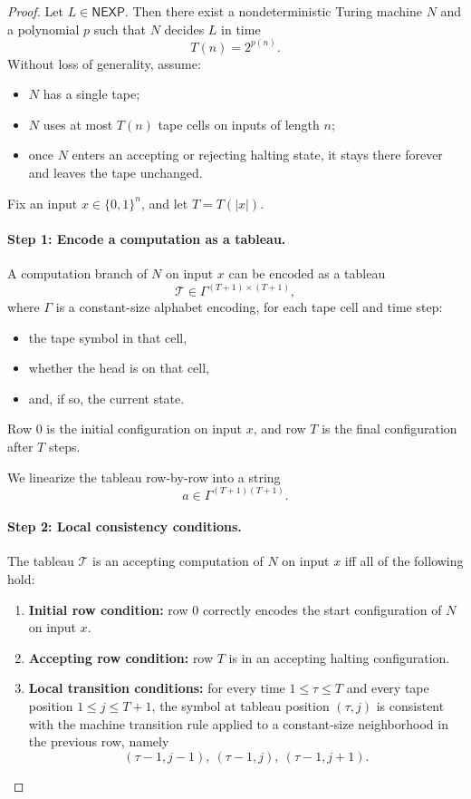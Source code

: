 \documentclass[11pt]{article}
\begin{document}
\begin{proof}
Let \(L\in \mathsf{NEXP}\). Then there exist a nondeterministic Turing machine \(N\) and a polynomial \(p\) such that \(N\) decides \(L\) in time
\[
T(n)=2^{p(n)}.
\]
Without loss of generality, assume:
\begin{itemize}
    \item \(N\) has a single tape;
    \item \(N\) uses at most \(T(n)\) tape cells on inputs of length \(n\);
    \item once \(N\) enters an accepting or rejecting halting state, it stays there forever and leaves the tape unchanged.
\end{itemize}

Fix an input \(x\in\{0,1\}^n\), and let \(T=T(|x|)\).

\paragraph{Step 1: Encode a computation as a tableau.}
A computation branch of \(N\) on input \(x\) can be encoded as a tableau
\[
\mathcal{T}\in \Gamma^{(T+1)\times (T+1)},
\]
where \(\Gamma\) is a constant-size alphabet encoding, for each tape cell and time step:
\begin{itemize}
    \item the tape symbol in that cell,
    \item whether the head is on that cell,
    \item and, if so, the current state.
\end{itemize}
Row \(0\) is the initial configuration on input \(x\), and row \(T\) is the final configuration after \(T\) steps.

We linearize the tableau row-by-row into a string
\[
a \in \Gamma^{(T+1)(T+1)}.
\]

\paragraph{Step 2: Local consistency conditions.}
The tableau \(\mathcal{T}\) is an accepting computation of \(N\) on input \(x\) iff all of the following hold:

\begin{enumerate}
    \item \textbf{Initial row condition:} row \(0\) correctly encodes the start configuration of \(N\) on input \(x\).
    \item \textbf{Accepting row condition:} row \(T\) is in an accepting halting configuration.
    \item \textbf{Local transition conditions:} for every time \(1\le \tau \le T\) and every tape position \(1\le j\le T+1\), the symbol at tableau position \((\tau,j)\) is consistent with the machine transition rule applied to a constant-size neighborhood in the previous row, namely
    \[
    (\tau-1,j-1),\ (\tau-1,j),\ (\tau-1,j+1).
    \]
\end{enumerate}


\end{proof}
\end{document}
